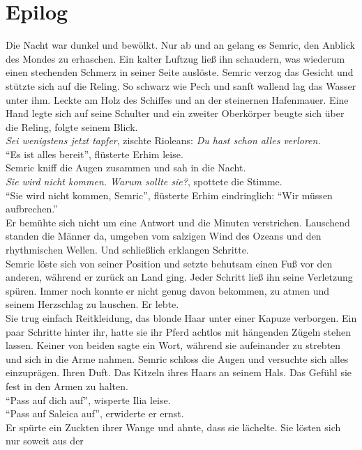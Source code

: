 \chapter{Epilog}

Die Nacht war dunkel und bewölkt. Nur ab und an gelang es Semric, den Anblick des Mondes zu 
erhaschen. Ein kalter Luftzug ließ ihn schaudern, was wiederum einen stechenden Schmerz in seiner 
Seite auslöste. Semric verzog das Gesicht und stützte sich auf die Reling. So schwarz wie Pech und 
sanft wallend lag das Wasser unter ihm. Leckte am Holz des Schiffes und an der steinernen 
Hafenmauer. Eine Hand legte sich auf seine Schulter und ein zweiter Oberkörper beugte sich über die 
Reling, folgte seinem Blick.\\
\textit{Sei wenigstens jetzt tapfer}, zischte Rioleans: \textit{Du hast schon alles verloren.}\\
``Es ist alles bereit'', flüsterte Erhim leise.\\
Semric kniff die Augen zusammen und sah in die Nacht.\\
\textit{Sie wird nicht kommen. Warum sollte sie?}, spottete die Stimme.\\
``Sie wird nicht kommen, Semric'', flüsterte Erhim eindringlich: ``Wir müssen aufbrechen.''\\
Er bemühte sich nicht um eine Antwort und die Minuten verstrichen. Lauschend standen die Männer da, 
umgeben vom salzigen Wind des Ozeans und den rhythmischen Wellen. Und schließlich erklangen 
Schritte.\\
Semric löste sich von seiner Position und setzte behutsam einen Fuß vor den anderen, während er 
zurück an Land ging. Jeder Schritt ließ ihn seine Verletzung spüren. Immer noch konnte er nicht 
genug davon bekommen, zu atmen und seinem Herzschlag zu lauschen. Er lebte.\\
Sie trug einfach Reitkleidung, das blonde Haar unter einer Kapuze verborgen. Ein paar Schritte 
hinter ihr, hatte sie ihr Pferd achtlos mit hängenden Zügeln stehen lassen. Keiner von beiden sagte 
ein Wort, während sie aufeinander zu strebten und sich in die Arme nahmen. Semric schloss die Augen 
und versuchte sich alles einzuprägen. Ihren Duft. Das Kitzeln ihres Haars an seinem Hals. Das 
Gefühl sie fest in den Armen zu halten.\\
``Pass auf dich auf'', wisperte Ilia leise.\\
``Pass auf Saleica auf'', erwiderte er ernst.\\
Er spürte ein Zuckten ihrer Wange und ahnte, dass sie lächelte. Sie lösten sich nur soweit aus der 
